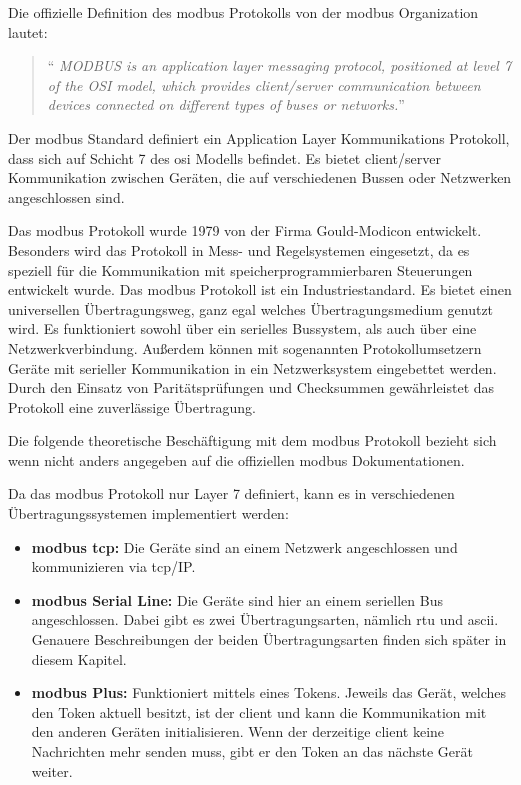 \label{modbus_kapitel}
Die offizielle Definition des \gls{modbus} Protokolls von der \gls{modbus} Organization \cite[vgl.][]{Modbus_Organization_AP:2012} lautet:
\begin{quotation}
	\enquote{\emph{
		MODBUS is an application layer messaging protocol, positioned at level 7 of the OSI model, which provides client/server communication between devices connected on different types of buses or networks.}}
\end{quotation}

Der \gls{modbus} Standard definiert ein Application Layer Kommunikations Protokoll, dass sich auf Schicht 7 des \gls{osi} Modells befindet. Es bietet \gls{client}/\gls{server} Kommunikation zwischen Geräten, die auf verschiedenen Bussen oder Netzwerken angeschlossen sind.

Das \gls{modbus} Protokoll wurde 1979 von der Firma Gould-Modicon entwickelt. Besonders wird das Protokoll in Mess- und Regelsystemen eingesetzt, da es speziell für die Kommunikation mit speicherprogrammierbaren Steuerungen entwickelt wurde. Das \gls{modbus} Protokoll ist ein Industriestandard. Es bietet einen universellen Übertragungsweg, ganz egal welches Übertragungsmedium genutzt wird. Es funktioniert sowohl über ein serielles Bussystem, als auch über eine Netzwerkverbindung. Außerdem können mit sogenannten Protokollumsetzern Geräte mit serieller Kommunikation in ein Netzwerksystem eingebettet werden. Durch den Einsatz von Paritätsprüfungen und Checksummen gewährleistet das Protokoll eine zuverlässige Übertragung. \cite[vgl.][]{KUNBUS_GmbH:o.J., kvm-concepts_GmbH:2022}


Die folgende theoretische Beschäftigung mit dem \gls{modbus} Protokoll bezieht sich wenn nicht anders angegeben auf die offiziellen \gls{modbus} Dokumentationen. \cite[vgl.][]{Modbus_Organization_AP:2012, Modbus_Organization_SL:2012}

Da das \gls{modbus} Protokoll nur Layer 7 definiert, kann es in verschiedenen Übertragungssystemen implementiert werden:
\begin{itemize}
	\item \textbf{\gls{modbus} \acs{tcp}:} Die Geräte sind an einem Netzwerk angeschlossen und kommunizieren via \acs{tcp}/IP.
	\item \textbf{\gls{modbus} Serial Line:} Die Geräte sind hier an einem seriellen Bus angeschlossen. Dabei gibt es zwei Übertragungsarten, nämlich \acs{rtu} und \acs{ascii}. Genauere Beschreibungen der beiden Übertragungsarten finden sich später in diesem Kapitel.
	\item \textbf{\gls{modbus} Plus:} Funktioniert mittels eines Tokens. Jeweils das Gerät, welches den Token aktuell besitzt, ist der \gls{client} und kann die Kommunikation mit den anderen Geräten initialisieren. Wenn der derzeitige \gls{client} keine Nachrichten mehr senden muss, gibt er den Token an das nächste Gerät weiter. \cite[vgl.][]{Rinaldi:2016}
\end{itemize}

